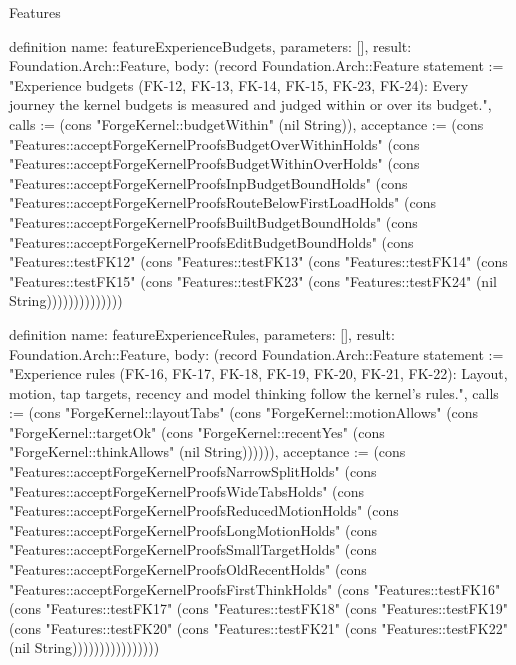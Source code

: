 \begin{lexlean}{Features}
\begin{semanticmodule}
definition{
  name: featureExperienceBudgets,
  parameters: [],
  result: Foundation.Arch::Feature,
  body: (record Foundation.Arch::Feature {statement := "Experience budgets (FK-12, FK-13, FK-14, FK-15, FK-23, FK-24): Every journey the kernel budgets is measured and judged within or over its budget.", calls := (cons "ForgeKernel::budgetWithin" (nil String)), acceptance := (cons "Features::acceptForgeKernelProofsBudgetOverWithinHolds" (cons "Features::acceptForgeKernelProofsBudgetWithinOverHolds" (cons "Features::acceptForgeKernelProofsInpBudgetBoundHolds" (cons "Features::acceptForgeKernelProofsRouteBelowFirstLoadHolds" (cons "Features::acceptForgeKernelProofsBuiltBudgetBoundHolds" (cons "Features::acceptForgeKernelProofsEditBudgetBoundHolds" (cons "Features::testFK12" (cons "Features::testFK13" (cons "Features::testFK14" (cons "Features::testFK15" (cons "Features::testFK23" (cons "Features::testFK24" (nil String)))))))))))))})
}

definition{
  name: featureExperienceRules,
  parameters: [],
  result: Foundation.Arch::Feature,
  body: (record Foundation.Arch::Feature {statement := "Experience rules (FK-16, FK-17, FK-18, FK-19, FK-20, FK-21, FK-22): Layout, motion, tap targets, recency and model thinking follow the kernel's rules.", calls := (cons "ForgeKernel::layoutTabs" (cons "ForgeKernel::motionAllows" (cons "ForgeKernel::targetOk" (cons "ForgeKernel::recentYes" (cons "ForgeKernel::thinkAllows" (nil String)))))), acceptance := (cons "Features::acceptForgeKernelProofsNarrowSplitHolds" (cons "Features::acceptForgeKernelProofsWideTabsHolds" (cons "Features::acceptForgeKernelProofsReducedMotionHolds" (cons "Features::acceptForgeKernelProofsLongMotionHolds" (cons "Features::acceptForgeKernelProofsSmallTargetHolds" (cons "Features::acceptForgeKernelProofsOldRecentHolds" (cons "Features::acceptForgeKernelProofsFirstThinkHolds" (cons "Features::testFK16" (cons "Features::testFK17" (cons "Features::testFK18" (cons "Features::testFK19" (cons "Features::testFK20" (cons "Features::testFK21" (cons "Features::testFK22" (nil String)))))))))))))))})
}


\end{semanticmodule}
\end{lexlean}
